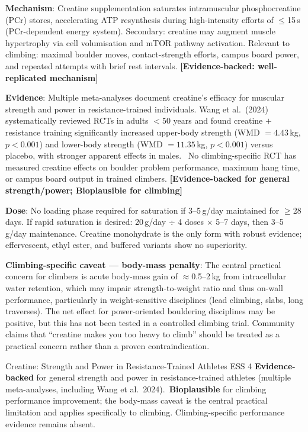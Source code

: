 \textbf{Mechanism}: Creatine supplementation saturates intramuscular phosphocreatine (PCr) stores, accelerating ATP resynthesis during high-intensity efforts of $\leq$15\,s (PCr-dependent energy system). Secondary: creatine may augment muscle hypertrophy via cell volumisation and mTOR pathway activation. Relevant to climbing: maximal boulder moves, contact-strength efforts, campus board power, and repeated attempts with brief rest intervals. \textbf{[Evidence-backed: well-replicated mechanism]}

\textbf{Evidence}: Multiple meta-analyses document creatine's efficacy for muscular strength and power in resistance-trained individuals. Wang et al.\ (2024) systematically reviewed RCTs in adults $<$50 years and found creatine $+$ resistance training significantly increased upper-body strength (WMD ${=}4.43$\,kg, $p{<}0.001$) and lower-body strength (WMD ${=}11.35$\,kg, $p{<}0.001$) versus placebo, with stronger apparent effects in males.\ \cite{Wangetal24} No climbing-specific RCT has measured creatine effects on boulder problem performance, maximum hang time, or campus board output in trained climbers. \textbf{[Evidence-backed for general strength/power; Bioplausible for climbing]}

\textbf{Dose}: No loading phase required for saturation if 3--5\,g/day maintained for $\geq$28 days. If rapid saturation is desired: 20\,g/day $\div$ 4 doses $\times$ 5--7 days, then 3--5\,g/day maintenance. Creatine monohydrate is the only form with robust evidence; effervescent, ethyl ester, and buffered variants show no superiority.

\textbf{Climbing-specific caveat --- body-mass penalty}: The central practical concern for climbers is acute body-mass gain of ${\approx}$0.5--2\,kg from intracellular water retention, which may impair strength-to-weight ratio and thus on-wall performance, particularly in weight-sensitive disciplines (lead climbing, slabs, long traverses). The net effect for power-oriented bouldering disciplines may be positive, but this has not been tested in a controlled climbing trial. Community claims that ``creatine makes you too heavy to climb'' should be treated as a practical concern rather than a proven contraindication.

\begin{evidencebox}{Creatine: Strength and Power in Resistance-Trained Athletes \cdot \evidencebacked \cdot ESS 4}
\textbf{Evidence-backed} for general strength and power in resistance-trained athletes (multiple meta-analyses, including Wang et al.\ 2024).\ \textbf{Bioplausible} for climbing performance improvement; the body-mass caveat is the central practical limitation and applies specifically to climbing. Climbing-specific performance evidence remains absent.
\end{evidencebox}

